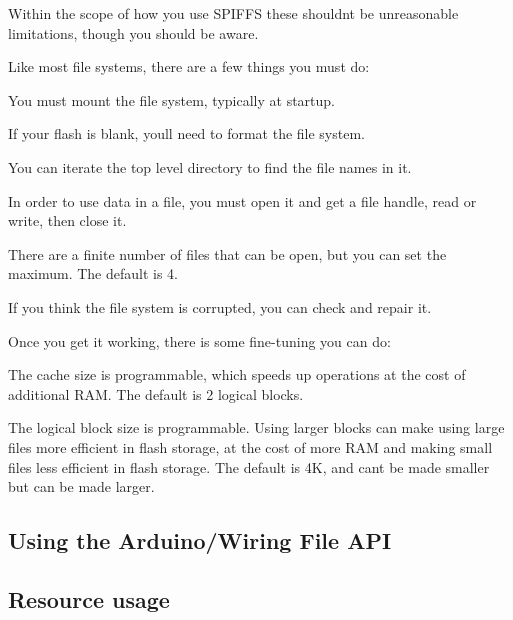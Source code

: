 Within the scope of how you use S\+P\+I\+F\+FS these shouldn\textquotesingle{}t be unreasonable limitations, though you should be aware.

Like most file systems, there are a few things you must do\+:


\begin{DoxyItemize}
\item You must mount the file system, typically at startup.
\item If your flash is blank, you\textquotesingle{}ll need to format the file system.
\item You can iterate the top level directory to find the file names in it.
\item In order to use data in a file, you must open it and get a file handle, read or write, then close it.
\item There are a finite number of files that can be open, but you can set the maximum. The default is 4.
\item If you think the file system is corrupted, you can check and repair it.
\end{DoxyItemize}

Once you get it working, there is some fine-\/tuning you can do\+:


\begin{DoxyItemize}
\item The cache size is programmable, which speeds up operations at the cost of additional R\+AM. The default is 2 logical blocks.
\item The logical block size is programmable. Using larger blocks can make using large files more efficient in flash storage, at the cost of more R\+AM and making small files less efficient in flash storage. The default is 4K, and can\textquotesingle{}t be made smaller but can be made larger.
\end{DoxyItemize}

\subsection*{Using the Arduino/\+Wiring File A\+PI}

\subsection*{Resource usage}